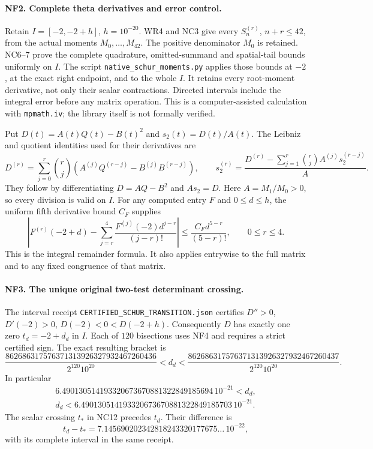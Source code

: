 \paragraph{NF2. Complete theta derivatives and error control.}
Retain $I=[-2,-2+h]$, $h=10^{-20}$. WR4 and NC3 give every
$S_n^{(r)}$, $n+r\le42$, from the actual moments $M_0,\ldots,M_{42}$.
The positive denominator $M_0$ is retained. NC6--7 prove the complete
quadrature, omitted-summand and spatial-tail bounds uniformly on
$I$. The script \texttt{native\_schur\_moments.py} applies those
bounds at $-2$, at the exact right endpoint, and to the whole $I$.
It retains every root-moment derivative, not only their scalar
contractions. Directed intervals include the integral error before
any matrix operation. This is a computer-assisted calculation with
\texttt{mpmath.iv}; the library itself is not formally verified.

Put $D(t)=A(t)Q(t)-B(t)^2$ and $s_2(t)=D(t)/A(t)$.
The Leibniz and quotient identities used for their derivatives are
\[
 D^{(r)}=\sum_{j=0}^r\binom rj
 (A^{(j)}Q^{(r-j)}-B^{(j)}B^{(r-j)}),\qquad
 s_2^{(r)}=\frac{D^{(r)}-\sum_{j=1}^r\binom rj A^{(j)}s_2^{(r-j)}}{A}.
 \tag{NF3}
\]
They follow by differentiating $D=AQ-B^2$ and $As_2=D$.
Here $A=M_1/M_0>0$, so every division is valid on $I$.
For any computed entry $F$ and $0\le d\le h$, the uniform fifth
derivative bound $C_F$ supplies
\[
 \left|F^{(r)}(-2+d)-
 \sum_{j=r}^4\frac{F^{(j)}(-2)d^{j-r}}{(j-r)!}\right|
 \le \frac{C_Fd^{5-r}}{(5-r)!},\qquad 0\le r\le4.
 \tag{NF4}
\]
This is the integral remainder formula. It also applies entrywise
to the full matrix and to any fixed congruence of that matrix.

\paragraph{NF3. The unique original two-test determinant crossing.}
The interval receipt \texttt{CERTIFIED\_SCHUR\_TRANSITION.json}
certifies $D''>0$, $D'(-2)>0$, $D(-2)<0<D(-2+h)$.
Consequently $D$ has exactly one zero $t_d=-2+d_d$ in $I$.
Each of $120$ bisections uses NF4 and requires a strict certified
sign. The exact resulting bracket is
\[
 \frac{862686317576371313926327932467260436}{2^{120}10^{20}}
 <d_d<
 \frac{862686317576371313926327932467260437}{2^{120}10^{20}}.
 \tag{NF5}
\]
In particular
\[
\begin{split}
6.490130514193320673670881322849185694\,10^{-21}<d_d,\\
d_d<6.490130514193320673670881322849185703\,10^{-21}.
\end{split}\tag{NF6}
\]
The scalar crossing $t_*$ in NC12 precedes $t_d$. Their difference is
\[
t_d-t_*=7.145690202342818243320177675\ldots\,10^{-22},
\]
with its complete interval in the same receipt.

